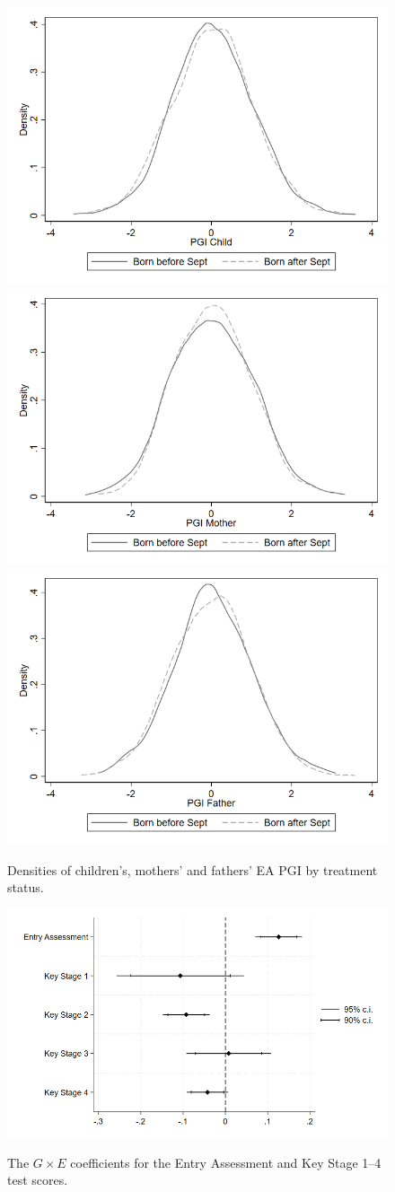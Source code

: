 \documentclass[12pt,a4paper]{article}
\begin{document}
\begin{bibunit}
\renewcommand{\thetable}{G.\arabic{table}}
\renewcommand{\thefigure}{G.\arabic{figure}}
\renewcommand{\theequation}{G.\arabic{equation}}
\setcounter{table}{1} 
\setcounter{figure}{0} 
\setcounter{equation}{0} 

\begin{figure}[H]
\centering 
\caption{Densities of children's, mothers' and fathers' EA PGI by treatment status.}
\includegraphics[width=0.49\linewidth]{include/kdens_treat_PGS.png} \\
\includegraphics[width=0.49\linewidth]{include/kdens_treat_PGS_mothers.png}
\includegraphics[width=0.49\linewidth]{include/kdens_treat_PGS_fathers.png}
\label{fig:kdens_treat_PGI}
\end{figure}

\begin{figure}[ht]
\centering 
\caption{The $G \times E$ coefficients for the Entry Assessment and Key Stage 1--4 test scores.}
\includegraphics[width=0.6\linewidth]{include/coefplot_gxe.png}
\label{fig:coefplot}
\end{figure}


\end{bibunit}
\end{document}
